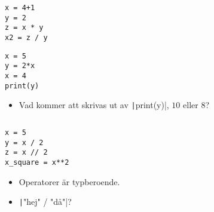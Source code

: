 \begin{frame}[fragile]
  \begin{example}[Heltalsoperationer]
    \begin{verbatim}
x = 4+1
y = 2
z = x * y
x2 = z / y
    \end{verbatim}
  \end{example}
\end{frame}

\begin{frame}[fragile]
  \begin{example}
    \begin{verbatim}
x = 5
y = 2*x
x = 4
print(y)
    \end{verbatim}
  \end{example}

  \begin{exercise}
    \begin{itemize}
      \item Vad kommer att skrivas ut av \texttt|print(y)|,
        \(10\) eller \(8\)?
    \end{itemize}
  \end{exercise}
\end{frame}

\begin{frame}[fragile]
  \inputminted[highlightlines={12,25,28},linenos,firstline=11]{python}{examples/age.py}
\end{frame}

\begin{frame}[fragile]
  \begin{example}
    \begin{verbatim}
x = 5
y = x / 2
z = x // 2
x_square = x**2
    \end{verbatim}
  \end{example}

  \pause

  \begin{remark}
    \begin{itemize}
      \item Operatorer är typberoende.
      \item \texttt|"hej" / "då"|?
    \end{itemize}
  \end{remark}
\end{frame}


